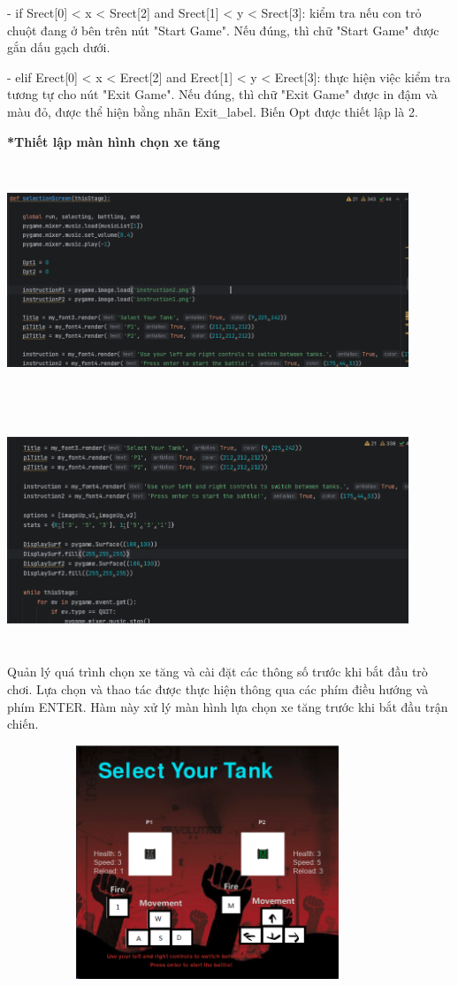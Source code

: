 \documentclass[a4paper]{article}
\begin{document}
        - if Srect[0] < x < Srect[2] and Srect[1] < y < Srect[3]: kiểm tra nếu con trỏ chuột đang ở bên trên nút "Start Game". Nếu đúng, thì chữ "Start Game" được gắn dấu gạch dưới.

        - elif Erect[0] < x < Erect[2] and Erect[1] < y < Erect[3]: thực hiện việc kiểm tra tương tự cho nút "Exit Game". Nếu đúng, thì chữ "Exit Game" được in đậm và màu đỏ, được thể hiện bằng nhãn Exit_label. Biến Opt được thiết lập là 2.

        \textbf{*Thiết lập màn hình chọn xe tăng}
        
        \includegraphics[width=12cm,height=7cm]{selecteTank.png}

        \includegraphics[width=12cm,height=7cm]{selectedTank2.png}

        Quản lý quá trình chọn xe tăng và cài đặt các thông số trước khi bắt đầu trò chơi. Lựa chọn và thao tác được thực hiện thông qua các phím điều hướng và phím ENTER. Hàm này xử lý màn hình lựa chọn xe tăng trước khi bắt đầu trận chiến.

        \includegraphics[width=12cm,height=7cm]{selectedTank3.png}
\end{document}
